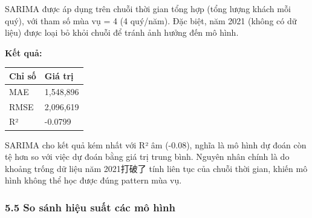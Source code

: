\documentclass[11pt]{article}
\begin{document}
SARIMA được áp dụng trên chuỗi thời gian tổng hợp (tổng lượng khách mỗi
quý), với tham số mùa vụ = 4 (4 quý/năm). Đặc biệt, năm 2021 (không có
dữ liệu) được loại bỏ khỏi chuỗi để tránh ảnh hưởng đến mô hình.

\textbf{Kết quả:}

\begin{longtable}[]{@{}ll@{}}
\toprule\noalign{}
Chỉ số & Giá trị \\
\midrule\noalign{}
\endhead
\bottomrule\noalign{}
\endlastfoot
MAE & 1,548,896 \\
RMSE & 2,096,619 \\
R² & -0.0799 \\
\end{longtable}

SARIMA cho kết quả kém nhất với R² âm (-0.08), nghĩa là mô hình dự đoán
còn tệ hơn so với việc dự đoán bằng giá trị trung bình. Nguyên nhân
chính là do khoảng trống dữ liệu năm 2021打破了 tính liên tục của chuỗi
thời gian, khiến mô hình không thể học được đúng pattern mùa vụ.

\subsubsection{5.5 So sánh hiệu suất các mô
hình}\label{so-suxe1nh-hiux1ec7u-suux1ea5t-cuxe1c-muxf4-huxecnh}
\end{document}
